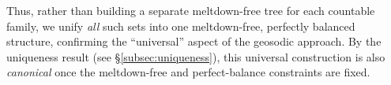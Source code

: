 Thus, rather than building a separate meltdown-free tree for each countable family, 
we unify \emph{all} such sets into one meltdown-free, perfectly balanced structure, 
confirming the “universal” aspect of the geosodic approach. By the uniqueness result (see \S\ref{subsec:uniqueness}), 
this universal construction is also \emph{canonical} once the meltdown-free and
perfect-balance constraints are fixed.

